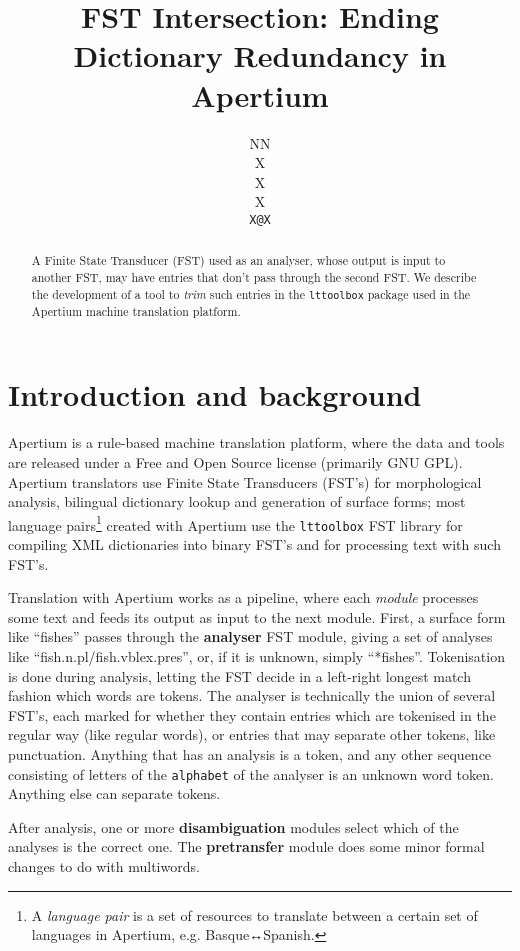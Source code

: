 \documentclass[11pt]{article}
\author{NN\\  X \\ X \\  X \\  {\tt \small   X@X}}
\title{FST Intersection: Ending Dictionary Redundancy in Apertium} %
\begin{document}
\maketitle

\begin{abstract}
  A Finite State Transducer (FST) used as an analyser, whose output is
  input to another FST, may have entries that don't pass through the
  second FST. We describe the development of a tool to \emph{trim}
  such entries in the \texttt{lttoolbox} package used in the Apertium
  machine translation platform.
\end{abstract}

\section{Introduction and background}

Apertium\citep{forcada2011afp} is a rule-based machine translation
platform, where the data and tools are released under a Free and Open
Source license (primarily GNU GPL). Apertium translators use Finite
State Transducers (FST's) for morphological analysis, bilingual
dictionary lookup and generation of surface forms; most language
pairs\footnote{A \emph{language pair} is a set of resources to
    translate between a certain set of languages in Apertium, e.g.
    Basque↔Spanish.} created with Apertium use the \texttt{lttoolbox} FST
library for compiling XML dictionaries into binary FST's and for
processing text with such FST's.


Translation with Apertium works as a pipeline, where each
\emph{module} processes some text and feeds its output as input to the
next module. First, a surface form like ``fishes'' passes through the
\textbf{analyser} FST module, giving a set of analyses like
``fish.n.pl/fish.vblex.pres'', or, if it is unknown, simply
``*fishes''. Tokenisation is done during analysis, letting the FST
decide in a left-right longest match fashion which words are tokens.
The analyser is technically the union of several FST's, each marked
for whether they contain entries which are tokenised in the regular
way (like regular words), or entries that may separate other tokens,
like punctuation. Anything that has an analysis is a token, and any
other sequence consisting of letters of the \texttt{alphabet} of the
analyser is an unknown word token. Anything else can separate tokens.

After analysis, one or more \textbf{disambiguation} modules select
which of the analyses is the correct one. The \textbf{pretransfer}
module does some minor formal changes to do with multiwords.
\end{document}
